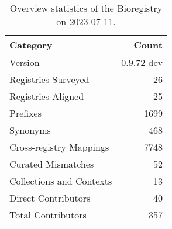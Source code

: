 \begin{table}
\caption{Overview statistics of the Bioregistry on 2023-07-11.}
\label{tab:bioregistry-summary}
\begin{tabular}{lr}
\toprule
Category & Count \\
\midrule
Version & 0.9.72-dev \\
Registries Surveyed & 26 \\
Registries Aligned & 25 \\
Prefixes & 1699 \\
Synonyms & 468 \\
Cross-registry Mappings & 7748 \\
Curated Mismatches & 52 \\
Collections and Contexts & 13 \\
Direct Contributors & 40 \\
Total Contributors & 357 \\
\bottomrule
\end{tabular}
\end{table}

